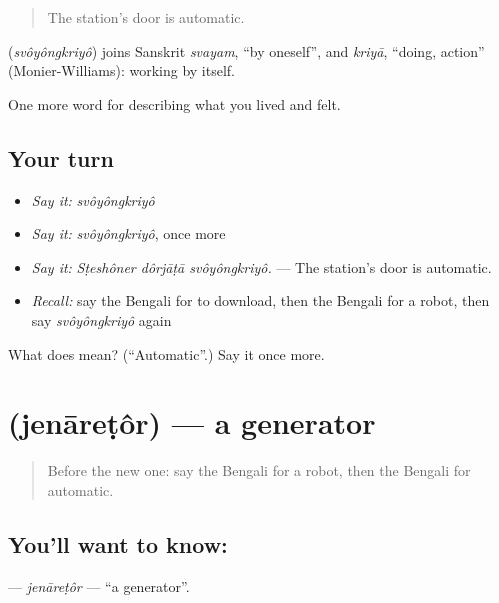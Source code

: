 \begin{quote}
The station's door is automatic.
\end{quote}

\begin{cousinweb}
\textbf{} (\emph{svôyôngkriyô}) joins Sanskrit \emph{svayam}, \textquotedblleft{}by oneself\textquotedblright{}, and \emph{kriyā}, \textquotedblleft{}doing, action\textquotedblright{} (Monier-Williams): working by itself.
\end{cousinweb}

\begin{grammarlens}[title={What you've built}]
One more word for describing what you lived and felt.
\end{grammarlens}

\subsection*{Your turn}
\begin{itemize}
\raggedright
  \item \emph{Say it:} \emph{svôyôngkriyô}
  \item \emph{Say it:} \emph{svôyôngkriyô}, once more
  \item \emph{Say it:} \emph{Sṭeshôner dôrjāṭā svôyôngkriyô.} — The station's door is automatic.
  \item \emph{Recall:} say the Bengali for to download, then the Bengali for a robot, then say \emph{svôyôngkriyô} again
\end{itemize}

\begin{tcolorbox}[breakable,colback=teal!4,colframe=teal!35!black,title={Before you move on}]
What does  mean? (\textquotedblleft{}Automatic\textquotedblright{}.) Say it once more.
\end{tcolorbox}
\section[\texorpdfstring{\bn{জেনারেটর} (jenāreṭôr)}{জেনারেটর (jenāreṭôr)}]{ (jenāreṭôr) — a generator}

\label{lesson:BN-C504-jenaretor}



\begin{quote}
Before the new one: say the Bengali for a robot, then the Bengali for automatic.
\end{quote}

\subsection*{You'll want to know: }
\textbf{} — \emph{jenāreṭôr} — \textquotedblleft{}a generator\textquotedblright{}.

